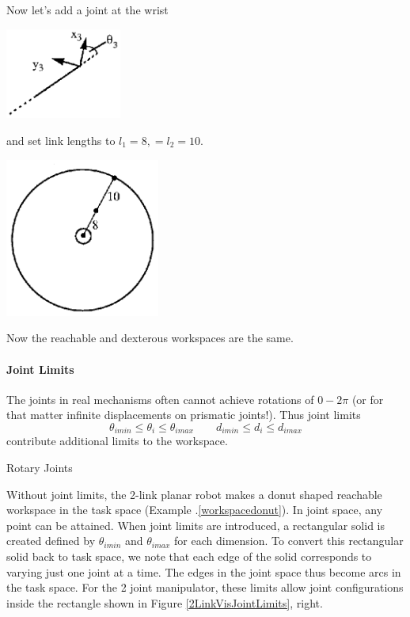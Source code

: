 \newpage
\begin{ExampleCont}

Now let's add a joint at the wrist

\includegraphics[width=1.5in]{figs04/00428.eps}


and set link lengths to $l_1 = 8,  = l_2 = 10 $.

\includegraphics[width=2.0in]{figs04/00429.eps}

Now the reachable and dexterous workspaces are the same.
\end{ExampleCont}


\paragraph{Joint Limits}

The joints in real mechanisms often cannot achieve rotations of $0-2\pi$ (or for that matter infinite displacements on prismatic joints!).  Thus joint limits
\[
\theta_{imin} \le \theta_i \le \theta_{imax} \qquad d_{imin} \le d_i \le d_{imax}
\]
contribute additional limits to the workspace.

Rotary Joints

Without joint limits, the 2-link planar robot makes a donut shaped reachable workspace in the task space (Example \thechapter.\ref{workspacedonut}).  In joint space, any point can be attained.  When joint limits are introduced, a rectangular solid is created defined by $\theta_{imin}$ and $\theta_{imax}$ for each dimension.   To convert this rectangular solid back to task space, we note that each edge of the solid corresponds to varying just one joint at a time.  The edges in the joint space thus become arcs in the task space.   For the 2 joint manipulator, these limits allow joint configurations inside the rectangle shown in Figure \ref{2LinkVisJointLimits}, right.

